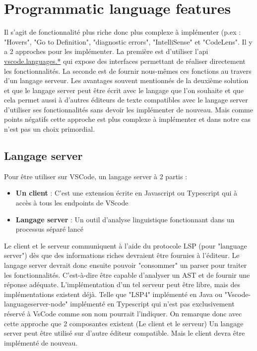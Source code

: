 \documentclass[
    iict, %
    il, %
]{heig-tb}
\begin{document}
\section{Programmatic language features}
Il s'agit de fonctionnalité plus riche donc plus complexe à implémenter (p.ex : "Hovers", "Go to Definition", "diagnostic errors", "IntelliSense" \space et "CodeLens".
Il y a 2 approches pour les implémenter.
La première est d'utiliser l'api \href{https://code.visualstudio.com/api/references/vscode-api#languages}{vscode.languages.*} qui expose des interfaces permettant de réaliser directement les fonctionnalités.
La seconde est de fournir nous-mêmes ces fonctions au travers d'un langage serveur.
Les avantages souvent mentionnés de la deuxième solution et que le langage server peut être écrit avec le langage que l'on souhaite et que cela permet aussi à d'autres éditeurs de texte compatibles avec le langage server d'utiliser ses fonctionnalités sans devoir les implémenter de nouveau. Mais comme points négatifs cette approche est plus complexe à implémenter et dans notre cas n'est pas un choix primordial.

\subsection{Langage server}
Pour être utiliser sur VSCode, un langage server à 2 partis :
\begin{itemize}
    \item \textbf{Un client} : C'est une extension écrite en Javascript ou Typescript qui à accès à tous les endpoints de VScode
    \item \textbf{Langage server} : Un outil d'analyse linguistique fonctionnant dans un processus séparé lancé
\end{itemize}

Le client et le serveur communiquent à l'aide du protocole LSP (pour "language server") dès que des informations riches devraient être fournies à l'éditeur.
Le langage server devrait donc ensuite pouvoir "consommer" un parser pour traiter les fonctionnalités. C'est-à-dire être capable d'analyser un AST et de fournir une réponse adéquate.
L'implémentation d'un tel serveur peut être libre, mais des implémentations existent déjà. Telle que "LSP4" implémenté en Java ou  "Vscode-languageserver-node" implémenté en Typescript qui n'est pas exclusivement réservé à VsCode comme son nom pourrait l'indiquer.
On remarque donc avec cette approche que 2 composantes existent (Le client et le serveur)
Un langage server peut être utilisé sur d'autre éditeur compatible. Mais le client devra être implémenté de nouveau.
\end{document}
